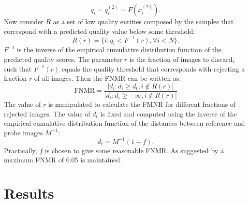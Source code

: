 \documentclass[letterpaper]{article} %
\begin{document}
\begin{equation}
    q_i = q_i^{(2)} = F(x_i^{(2)}).
\end{equation}
Now consider $R$ as a set of low quality entities composed by the samples that correspond with a predicted quality value below some threshold:
\begin{equation}
    R(r) = \{i : q_i < F^{-1}(r),  \forall i < N \}.
\end{equation}
$F^{-1}$ is the inverse of the empirical cumulative distribution function of the predicted quality scores. The parameter $r$ is the fraction of images to discard, such that $F^{-1}(r)$ equals the quality threshold that corresponds with rejecting a fraction $r$ of all images. Then the FNMR can be written as:
\begin{equation}
    \mathrm{FNMR} = \frac{|d_i : d_i \geq d_t, i \notin R(r)|}{|d_i : d_i \geq -\infty, i \notin R(r)|}
\end{equation}
The value of $r$ is manipulated to calculate the FMNR for different fractions of rejected images. The value of $d_t$ is fixed and computed using the inverse of the empirical cumulative distribution function of the distances between reference and probe images $M^{-1}$:
\begin{equation}
    d_t = M^{-1}(1 - f).
\end{equation}
Practically, $f$ is chosen to give some reasonable FNMR. As suggested by \cite{frontex} a maximum FNMR of 0.05 is maintained.
\section{Results}
\label{section:results}
\end{document}
